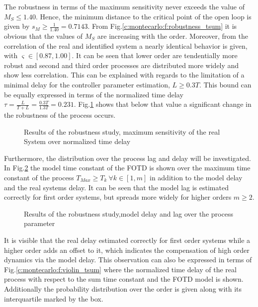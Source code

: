 The robustness in terms of the maximum sensitivity never exceeds the value of $M_S \leq 1.40$. Hence, the minimum distance to the critical point of the open loop is given by $s_M \geq \frac{1}{1.40} = 0.7143$. From Fig.\ref{c:montecarlo:f:robustness_tsum} it is obvious that the values of $M_S$ are increasing with the order. Moreover, from the correlation of the real and identified system a nearly identical behavior is given, with $\varsigma \in \left[0.87,1.00\right]$. It can be seen that lower order are tendentially more robust and second and third order processes are distributed more widely and show less correlation. This can be explained with regards to the limitation of a minimal delay for the controller parameter estimation, $L \geq 0.3 T$. This bound can be equally expressed in terms of the normalized time delay $\tau = \frac{L}{T+L} = \frac{0.3 T}{1.3 T} = 0.231$. Fig.\ref{c:montecarlo:f:robustness_normalizeddelay_tsum} shows that below that value a significant change in the robustness of the process occurs. 


\begin{figure}[H]\centering

\caption{Results of the robustness study, maximum sensitivity of the real System over normalized time delay}
\label{c:montecarlo:f:robustness_normalizeddelay_tsum}
\end{figure}

Furthermore, the distribution over the process lag and delay will be investigated. In Fig.\ref{c:montecarlo:f:parameter_tsum} the model time constant of the FOTD is shown over the maximum time constant of the process $T_{Max} \geq T_k ~\forall k \in \left[1,m\right]$ in addition to the model delay and the real systems delay. It can be seen that the model lag is estimated correctly for first order systems, but spreads more widely for higher orders $m \geq 2$. 

\begin{figure}[H]\centering

\caption{Results of the robustness study,model delay and lag over the process parameter}
\label{c:montecarlo:f:parameter_tsum}
\end{figure}

It is visible that the real delay estimated correctly for first order systems while a higher order adds an offset to it, which indicates the compensation of high order dynamics via the model delay. This observation can also be expressed in terms of Fig.\ref{c:montecarlo:f:violin_tsum} where the normalized time delay of the real process with respect to the sum time constant and the FOTD model is shown. Additionally the probability distribution over the order is given along with its interquartile marked by the box.



